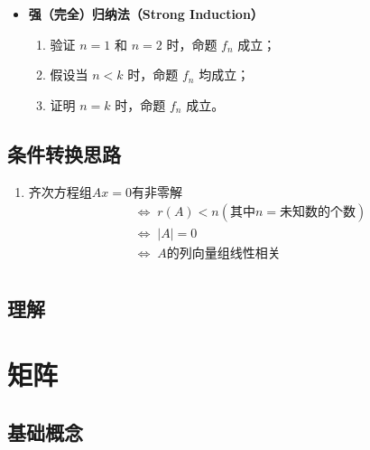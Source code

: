 \documentclass[a4paper,12pt]{article}
\begin{document}
\begin{enumerate}
\begin{itemize}
            \item \textbf{强（完全）归纳法（Strong Induction）}
            \begin{enumerate}
                \item 验证 $n = 1$ 和 $n = 2$ 时，命题 $f_n$ 成立；
                \item 假设当 $n < k$ 时，命题 $f_n$ 均成立；
                \item 证明 $n = k$ 时，命题 $f_n$ 成立。
            \end{enumerate}
        \end{itemize}
    \end{enumerate}

    \subsection{条件转换思路}

    \begin{enumerate}
        \item 齐次方程组$Ax = 0$有非零解
        \begin{align*}
            &\Leftrightarrow\; r(A) < n (\text{其中}n = \text{未知数的个数})  \\
            &\Leftrightarrow\; |A| = 0  \\
            &\Leftrightarrow\; A \text{的列向量组线性相关}  \\
        \end{align*}
    \end{enumerate}

    \subsection{理解}

    \begin{enumerate}
    \end{enumerate}

    \section{矩阵}

    \subsection{基础概念}
\end{document}
